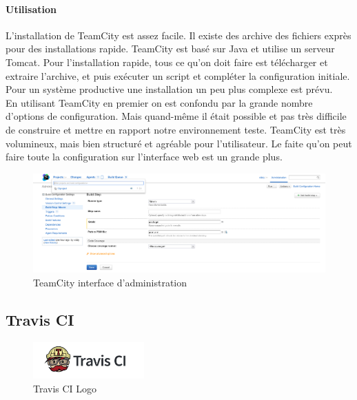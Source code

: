 \paragraph{Utilisation}
L'installation de TeamCity est assez facile. Il existe des archive des fichiers exprès pour des installations rapide. TeamCity est basé sur Java et utilise un serveur Tomcat. Pour l'installation rapide, tous ce qu'on doit faire est télécharger et extraire l'archive, et puis exécuter un script et compléter la configuration initiale. Pour un système productive une installation un peu plus complexe est prévu.\\
En utilisant TeamCity en premier on est confondu par la grande nombre d'options de configuration. Mais quand-même il était possible et pas très difficile de construire et mettre en rapport notre environnement teste. TeamCity est très volumineux, mais bien structuré et agréable pour l'utilisateur. Le faite qu'on peut faire toute la configuration sur l'interface web est un grande plus.
\begin{figure}[H]
	\centering
		\includegraphics[scale=0.35]{bilder/teamcityadmin}
	\caption{TeamCity interface d'administration}
	\label{fig:travisgui}
\end{figure}





\clearpage
\subsection{Travis CI}
\begin{figure}
  \begin{center}
    \includegraphics[width=0.38\textwidth]{bilder/Travis-CI-logo}
  \end{center}
  \caption{Travis CI Logo}
\end{figure}
